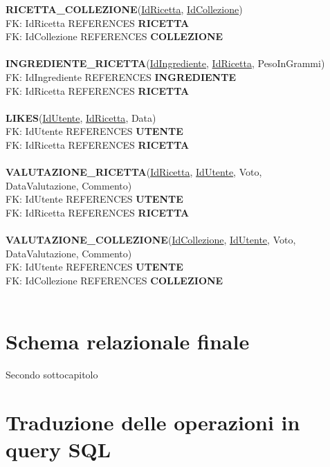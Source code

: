 ﻿\documentclass[a4paper,12pt]{report}
\begin{document}
\textbf{RICETTA\_COLLEZIONE}(\underline{IdRicetta}, \underline{IdCollezione})\\
FK: IdRicetta REFERENCES \textbf{RICETTA}\\
FK: IdCollezione REFERENCES \textbf{COLLEZIONE}\\\\
\textbf{INGREDIENTE\_RICETTA}(\underline{IdIngrediente}, \underline{IdRicetta}, PesoInGrammi)\\
FK: IdIngrediente REFERENCES \textbf{INGREDIENTE}\\
FK: IdRicetta REFERENCES \textbf{RICETTA}\\\\
\textbf{LIKES}(\underline{IdUtente}, \underline{IdRicetta}, Data)\\
FK: IdUtente REFERENCES \textbf{UTENTE}\\
FK: IdRicetta REFERENCES \textbf{RICETTA}\\\\
\textbf{VALUTAZIONE\_RICETTA}(\underline{IdRicetta}, \underline{IdUtente}, Voto,\\ DataValutazione, Commento)\\
FK: IdUtente REFERENCES \textbf{UTENTE}\\
FK: IdRicetta REFERENCES \textbf{RICETTA}\\\\
\textbf{VALUTAZIONE\_COLLEZIONE}(\underline{IdCollezione}, \underline{IdUtente}, Voto,\\ DataValutazione, Commento)\\
FK: IdUtente REFERENCES \textbf{UTENTE}\\
FK: IdCollezione REFERENCES \textbf{COLLEZIONE}\\\\
\section{Schema relazionale finale}
Secondo sottocapitolo

\section{Traduzione delle operazioni in query SQL}
\end{document}

